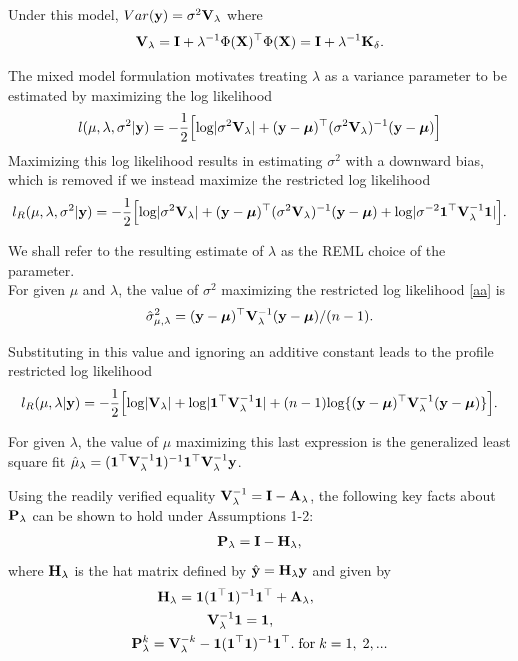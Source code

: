 \documentclass[article]{jss}
\begin{document}
\begin{appendix}
Under this model, $Var({\bf y})=\sigma^2 {\bf V}_\lambda$ where
\begin{align}
{\bf V}_\lambda={\bf I}+\lambda^{-1}\Phi({\bf X})^\top \Phi({\bf X})={\bf I}+\lambda^{-1}{\bf K}_\delta.
\end{align}

The mixed model formulation motivates treating $\lambda$ as a variance parameter to be estimated by maximizing the log likelihood
\begin{align*}
l(\mu, \lambda, \sigma^2|{\bf y})=-\frac{1}{2}\Big[\mbox{log}| \sigma^2 {\bf V}_\lambda | +({\bf y}-\boldsymbol{\mu})^\top (\sigma^2 {\bf V}_\lambda)^{-1}({\bf y}-\boldsymbol{\mu}) \Big]
\end{align*}
Maximizing this log likelihood results in estimating $\sigma^2$ with a downward bias, which is removed if we instead maximize the restricted log likelihood
\begin{align}
l_R(\mu, \lambda, \sigma^2|{\bf y})=-\frac{1}{2}\Big[\mbox{log}| \sigma^2 {\bf V}_\lambda | +({\bf y}-\boldsymbol{\mu})^\top (\sigma^2 {\bf V}_\lambda)^{-1}({\bf y}-\boldsymbol{\mu})+\mbox{log} | \sigma^{-2}\mathbf{1}^\top {\bf V}_\lambda^{-1}\mathbf{1} | \Big]. \label{aa} 
\end{align}

We shall refer to the resulting estimate of $\lambda$ as the REML choice of the parameter.\\
For given $\mu$ and $\lambda$, the value of $\sigma^2$ maximizing the restricted log likelihood \eqref{aa} is
\begin{align}
\hat{\sigma}_{\mu, \lambda}^2=({\bf y}-\boldsymbol{\mu})^\top {\bf V}_\lambda^{-1}({\bf y}-\boldsymbol{\mu})/(n-1).
\end{align}

Substituting in this value and ignoring an additive constant leads to the profile restricted log likelihood
\begin{align}
l_R(\mu, \lambda|{\bf y})=-\frac{1}{2}\Big[\mbox{log}| {\bf V}_\lambda | +\mbox{log} | \mathbf{1}^\top {\bf V}_\lambda^{-1}\mathbf{1} |+(n-1)\mbox{log}\{({\bf y}-\boldsymbol{\mu})^\top  {\bf V}_\lambda^{-1}({\bf y}-\boldsymbol{\mu})\}\Big]. \label{ee}
\end{align}

For given $\lambda$, the value of $\mu$ maximizing this last expression is the generalized least square fit $\hat{\mu}_\lambda=(\mathbf{1}^\top {\bf V}_\lambda^{-1}\mathbf{1})^{-1}\mathbf{1}^\top {\bf V}_\lambda^{-1}{\bf y}$.

Using the readily verified equality ${\bf V}_\lambda^{-1}={\bf I}-{\bf A}_\lambda$, the following key facts about ${\bf P}_\lambda$ can be shown to hold under Assumptions 1-2:
\begin{align}
{\bf P}_\lambda={\bf I}-{\bf H}_\lambda, \label{mm}
\end{align}
where ${\bf H}_\lambda$ is the hat matrix defined by $\hat{{\bf y}}={\bf H}_\lambda {\bf y}$ and given by
\begin{align}
{\bf H}_\lambda=\mathbf{1}(\mathbf{1}^\top \mathbf{1})^{-1}\mathbf{1}^\top &+{\bf A}_\lambda,\\
{\bf V}_\lambda^{-1}\mathbf{1}=\mathbf{1} \label{dd}, \\
{\bf P}_\lambda^k={\bf V}_\lambda^{-k}-\mathbf{1}(\mathbf{1}^\top \mathbf{1})^{-1}&\mathbf{1}^\top. \;\mbox{for}\;k=1,\;2,...\label{ii}
\end{align}


\end{appendix}
\end{document}
